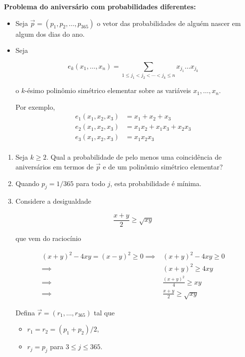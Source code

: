 \documentclass[
  11pt]{report}
\begin{document}
\begin{rmdbox}

\textbf{Problema do aniversário com probabilidades diferentes:}

\begin{itemize}
\item
  Seja $\vec p = (p_1, p_2, \ldots, p_{365})$ o vetor das probabilidades de alguém nascer em algum dos dias do ano.
\item
  Seja

  \[
  e_k(x_1, \ldots, x_n) = 
  \sum_{1 \leq j_1 < j_2 < \cdots < j_k \leq n}
  \!\!\!\!\!\!\!\!\!\!\!\!\!\! x_{j_1} \ldots x_{j_k}
  \]

  o $k$-ésimo polinômio simétrico elementar sobre as variáveis $x_1, \ldots, x_n$.

  Por exemplo,
  \[
  \begin{aligned}
    e_1(x_1, x_2, x_3) &= x_1 + x_2 + x_3 \\
    e_2(x_1, x_2, x_3) &= x_1x_2 + x_1x_3 + x_2x_3 \\
    e_3(x_1, x_2, x_3) &= x_1x_2x_3 \\
  \end{aligned}
  \]
\end{itemize}

\begin{enumerate}
\def\labelenumi{\alph{enumi}.}
\item
  Seja $k \geq 2$. Qual a probabilidade de pelo menos uma coincidência de aniversários em termos de $\vec p$ e de um polinômio simétrico elementar?
\item
  Quando $p_j = 1/365$ para todo $j$, esta probabilidade é mínima.
\item
  Considere a desigualdade

  \[
  \frac{x + y}{2} \geq \sqrt{xy}
  \]

  que vem do raciocínio

  \[
  \begin{aligned}
    (x + y)^2 - 4xy = (x - y)^2 \geq 0
    \implies &
    (x + y)^2 - 4xy \geq 0
    \\
    \implies &
    (x + y)^2 \geq 4xy
    \\
    \implies &
    \frac{(x + y)^2}{4} \geq xy
    \\
    \implies &
    \frac{x + y}{2} \geq \sqrt{xy}
  \end{aligned}
  \]

  Defina $\vec r = (r_1, \ldots, r_{365})$ tal que

  \begin{itemize}
  \item
    $r_1 = r_2 = (p_1 + p_2)/2$,
  \item
    $r_j = p_j$ para $3 \leq j \leq 365$.
  \end{itemize}


\end{enumerate}
\end{rmdbox}
\end{document}
